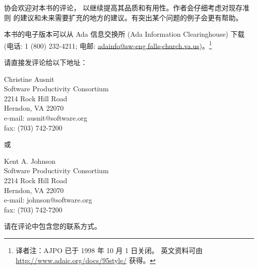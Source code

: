协会欢迎对本书的评论， 以继续提高其品质和有用性。作者会仔细考虑对现存准则
的建议和未来需要扩充的地方的建议。有突出某个问题的例子会更有帮助。

本书的电子版本可以从 Ada 信息交换所 (Ada Information Clearinghouse)
下载 (电话: 1 (800) 232-4211; 电邮:
\url{adainfo@sw-eng.falls-church.va.us})。\footnote{
译者注：AJPO 已于 1998 年 10 月 1 日关闭。
英文资料可由 \url{http://www.adaic.org/docs/95style/} 获得。}

请直接发评论给以下地址：

\noindent
Christine Ausnit\\
Software Productivity Consortium\\
2214 Rock Hill Road\\
Herndon, VA 22070\\
e-mail: ausnit@software.org\\
fax: (703) 742-7200

或

\noindent
Kent A. Johnson\\
Software Productivity Consortium\\
2214 Rock Hill Road\\
Herndon, VA 22070\\
e-mail: johnson@software.org\\
fax: (703) 742-7200

请在评论中包含您的联系方式。

